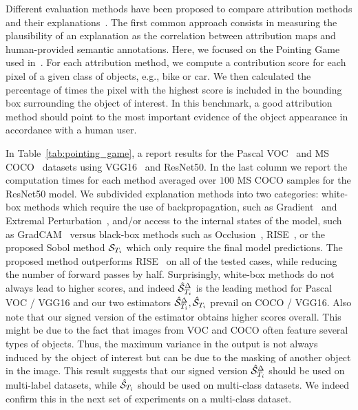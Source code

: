 Different evaluation methods have been proposed to compare attribution methods and their explanations~\cite{samek2016evaluating, hooker2018benchmark, aggregating2020, fel2020representativity}.
The first common approach consists in measuring the plausibility of an explanation as the correlation between attribution maps and human-provided semantic annotations. Here, we focused on the Pointing Game used in~\cite{zhang2018top, fong2017perturbation, fong2019extremal, petsiuk2018rise}. For each attribution method, we compute a contribution score for each pixel of a given class of objects, e.g., bike or car.
We then calculated the percentage of times the pixel with the highest score is included in the bounding box surrounding the object of interest. In this benchmark, a good attribution method should point to the most important evidence of the object appearance in accordance with a human user.

In Table~\ref{tab:pointing_game}, a report results for the Pascal VOC~\cite{everingham2010pascal} and MS COCO~\cite{coco} datasets using VGG16~\cite{simonyan2014deep} and ResNet50\cite{he2016deep}.
In the last column we report the computation times for each method averaged over $100$ MS COCO samples for the ResNet50 model.
We subdivided explanation methods into two categories: white-box methods which require the use of backpropagation, such as Gradient~\cite{zeiler2014visualizing} and Extremal Perturbation~\cite{fong2019extremal}, and/or access to the internal states of the model, such as GradCAM~\cite{Selvaraju_2019} versus black-box methods such as Occlusion~\cite{zeiler2014visualizing}, RISE~\cite{petsiuk2018rise}, or the proposed Sobol method $\mathcal{S}_{T_i}$ which only require the final model predictions. The proposed method outperforms RISE~\cite{petsiuk2018rise} on all of the tested cases, while reducing the number of forward passes by half.
Surprisingly, white-box methods do not always lead to higher scores, and indeed $\hat{\mathcal{S}}_{T_i}^\Delta$ is the leading method for Pascal VOC / VGG16 and our two estimators $\hat{\mathcal{S}}_{T_i}^\Delta, \hat{\mathcal{S}}_{T_i}$ prevail on COCO / VGG16.
Also note that our signed version of the estimator obtains higher scores overall.
This might be due to the fact that images from VOC and COCO often feature several types of objects. Thus, the maximum variance in the output is not always induced by the object of interest but can be due to the masking of another object in the image. This result suggests that our signed version $\hat{\mathcal{S}}_{T_i}^\Delta$ should be used on multi-label datasets, while $\hat{\mathcal{S}}_{T_i}$ should be used on multi-class datasets. We indeed confirm this in the next set of experiments on a multi-class dataset.

